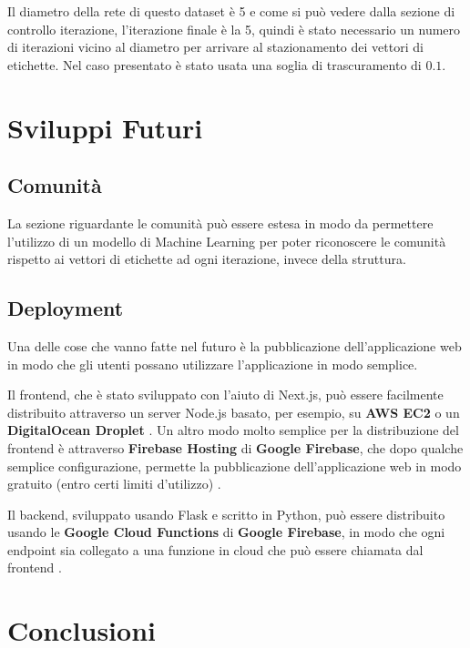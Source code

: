 \documentclass[a4paper,12pt]{report}
\begin{document}
		Il diametro della rete di questo dataset è 5 e come si può vedere dalla sezione di controllo iterazione, l'iterazione finale è la 5, quindi è stato necessario un numero di iterazioni vicino al diametro per arrivare al stazionamento dei vettori di etichette. Nel caso presentato è stato usata una soglia di trascuramento di $0.1$.
	
\chapter{Sviluppi Futuri}

	\section{Comunità}
	
	La sezione riguardante le comunità può essere estesa in modo da permettere l'utilizzo di un modello di Machine Learning per poter riconoscere le comunità rispetto ai vettori di etichette ad ogni iterazione, invece della struttura.

	\section{Deployment}

	Una delle cose che vanno fatte nel futuro è la pubblicazione dell'applicazione web in modo che gli utenti possano utilizzare l'applicazione in modo semplice.

	Il frontend, che è stato sviluppato con l'aiuto di Next.js, può essere facilmente distribuito attraverso un server Node.js basato, per esempio, su \textbf{AWS EC2} o un \textbf{DigitalOcean Droplet} \cite{nextjsdep}. Un altro modo molto semplice per la distribuzione del frontend è attraverso \textbf{Firebase Hosting} di \textbf{Google Firebase}, che dopo qualche semplice configurazione, permette la pubblicazione dell'applicazione web in modo gratuito (entro certi limiti d'utilizzo) \cite{firebasehosting}. 

	Il backend, sviluppato usando Flask e scritto in Python, può essere distribuito usando le \textbf{Google Cloud Functions} di \textbf{Google Firebase}, in modo che ogni endpoint sia collegato a una funzione in cloud che può essere chiamata dal frontend \cite{googlecloudfunctions}.

\chapter{Conclusioni}
\end{document}
